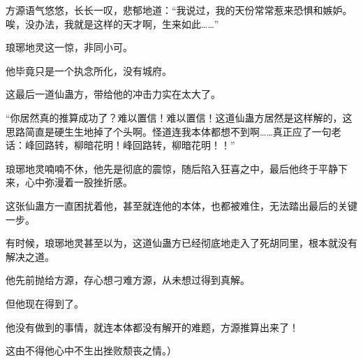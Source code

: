 \begin{this_body}
方源语气悠悠，长长一叹，悲郁地道：“我说过，我的天份常常惹来恐惧和嫉妒。唉，没办法，我就是这样的天才啊，生来如此……”

琅琊地灵这一惊，非同小可。

他毕竟只是一个执念所化，没有城府。

这最后一道仙蛊方，带给他的冲击力实在太大了。

“你居然真的推算成功了？难以置信！难以置信！这道仙蛊方居然是这样解的，这思路简直是硬生生地掉了个头啊。怪道连我本体都想不到啊……真正应了一句老话：峰回路转，柳暗花明！峰回路转，柳暗花明！！”

琅琊地灵喃喃不休，他先是彻底的震惊，随后陷入狂喜之中，最后他终于平静下来，心中弥漫着一股挫折感。

这张仙蛊方一直困扰着他，甚至就连他的本体，也都被难住，无法踏出最后的关键一步。

有时候，琅琊地灵甚至以为，这道仙蛊方已经彻底地走入了死胡同里，根本就没有解决之道。

他先前抛给方源，存心想刁难方源，从未想过得到真解。

但他现在得到了。

他没有做到的事情，就连本体都没有解开的难题，方源推算出来了！

这由不得他心中不生出挫败颓丧之情。）

\end{this_body}

